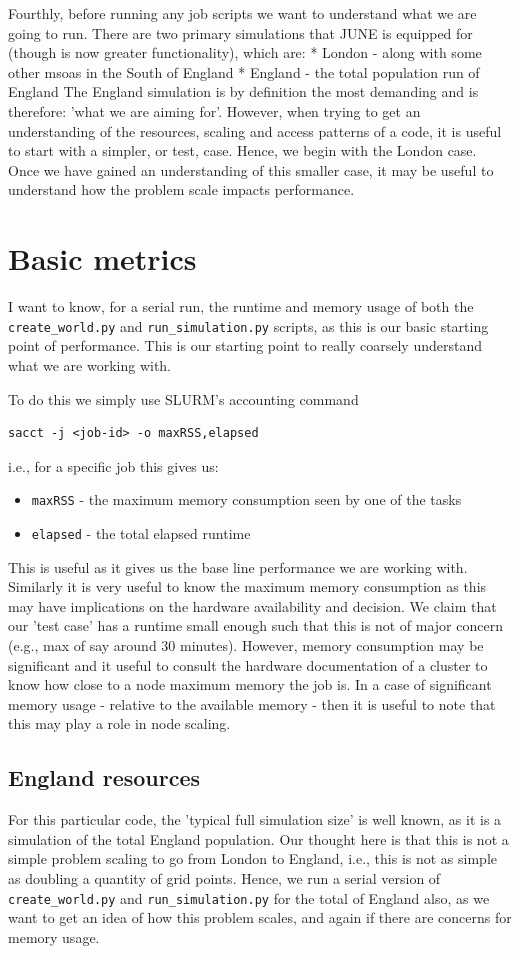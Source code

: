 Fourthly, before running any job scripts we want to understand what we are
going to run. There are two primary simulations that JUNE is equipped for
(though is now greater functionality), which are:
* London - along with some other msoas in the South of England
* England - the total population run of England
 The England simulation is by definition the most demanding and is therefore:
'what we are aiming for'.  However, when trying to get an understanding of the
resources, scaling and access patterns of a code, it is useful to start with a
simpler, or test, case.  Hence, we begin with the London case. Once we have
gained an understanding of this smaller case, it may be useful to understand
how the problem scale impacts performance.

\section{Basic metrics}
I want to know, for a serial run, the runtime and memory usage of both the
\verb|create_world.py| and \verb|run_simulation.py| scripts, as this is our basic
starting point of performance. This is our starting point to really coarsely
understand what we are working with.

To do this we simply use SLURM's accounting command
\begin{verbatim}
sacct -j <job-id> -o maxRSS,elapsed
\end{verbatim}
i.e., for a specific job this gives us:
\begin{itemize}
    \item \verb|maxRSS| - the maximum memory consumption seen by one of the tasks
    \item \verb|elapsed| - the total elapsed runtime
\end{itemize}
This is useful as it gives us the base line performance we are working with.
Similarly it is very useful to know the maximum memory consumption as this may
have implications on the hardware availability and decision. We claim that our
'test case' has a runtime small enough such that this is not of major concern
(e.g., max of say around 30 minutes). However, memory consumption may be
significant and it useful to consult the hardware documentation of a cluster to
know how close to a node maximum memory the job is. In a case of significant
memory usage - relative to the available memory - then it is useful to note
that this may play a role in node scaling.

\subsection{England resources}
For this particular code, the 'typical full simulation size' is well known, as
it is a simulation of the total England population. Our thought here is that
this is not a simple problem scaling to go from London to England, i.e., this
is not as simple as doubling a quantity of grid points. Hence, we run a serial
version of \verb|create_world.py| and \verb|run_simulation.py| for the total of England
also, as we want to get an idea of how this problem scales, and again if there
are concerns for memory usage.

